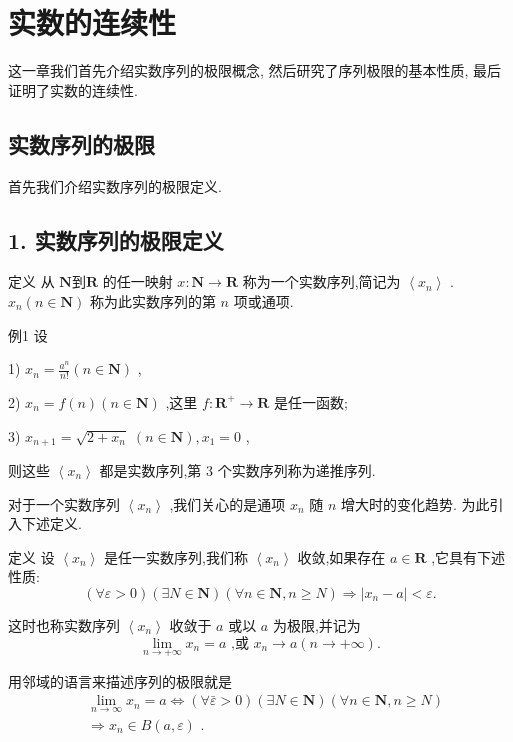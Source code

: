 \chapter{实数的连续性}

这一章我们首先介绍实数序列的极限概念, 然后研究了序列极限的基本性质, 最后证明了实数的连续性.

\section{实数序列的极限}

首先我们介绍实数序列的极限定义.

\section*{1. 实数序列的极限定义}

定义 从 $\mathbf{{N到R}}$ 的任一映射 $x : \mathbf{N} \rightarrow  \mathbf{R}$ 称为一个实数序列,简记为 $\left\langle  {x}_{n}\right\rangle$ . ${x}_{n}\left( {n \in  \mathbf{N}}\right)$ 称为此实数序列的第 $n$ 项或通项.

例1 设

1) ${x}_{n} = \frac{{a}^{n}}{n!}\left( {n \in  \mathbf{N}}\right)$ ,

2) ${x}_{n} = f\left( n\right) \left( {n \in  \mathbf{N}}\right)$ ,这里 $f : {\mathbf{R}}^{ + } \rightarrow  \mathbf{R}$ 是任一函数;

3) ${x}_{n + 1} = \sqrt{2 + {x}_{n}}\;\left( {n \in  \mathbf{N}}\right) ,{x}_{1} = 0$ ,

则这些 $\left\langle  {x}_{n}\right\rangle$ 都是实数序列,第 3 个实数序列称为递推序列.

对于一个实数序列 $\left\langle  {x}_{n}\right\rangle$ ,我们关心的是通项 ${x}_{n}$ 随 $n$ 增大时的变化趋势. 为此引入下述定义.

定义 设 $\left\langle  {x}_{n}\right\rangle$ 是任一实数序列,我们称 $\left\langle  {x}_{n}\right\rangle$ 收敛,如果存在 $a \in  \mathbf{R}$ ,它具有下述性质:
$$\left( {\forall \varepsilon  > 0}\right) \left( {\exists N \in  \mathbf{N}}\right) \left( {\forall n \in  \mathbf{N},n \geq  N}\right)  \Rightarrow  \left| {{x}_{n} - a}\right|  < \varepsilon .$$

这时也称实数序列 $\left\langle  {x}_{n}\right\rangle$ 收敛于 $a$ 或以 $a$ 为极限,并记为
$$\mathop{\lim }\limits_{{n \rightarrow   + \infty }}{x}_{n} = a\text{ ,或 }{x}_{n} \rightarrow  a\left( {n \rightarrow   + \infty }\right) .$$

用邻域的语言来描述序列的极限就是
\begin{align*}
	&\mathop{\lim }\limits_{{n \rightarrow  \infty }}{x}_{n} = a \Leftrightarrow  \left( {\forall \bar{\varepsilon } > 0}\right) \left( {\exists N \in  \mathbf{N}}\right) \left( {\forall n \in  \mathbf{N},n \geq  N}\right)\\
	&\Rightarrow  {x}_{n} \in  B\left( {a,\varepsilon }\right) \text{ . }
\end{align*}

